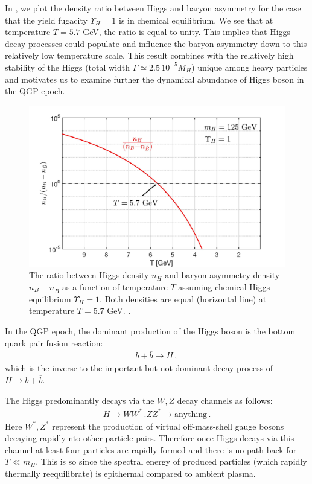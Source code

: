In , we plot the density ratio between Higgs and baryon asymmetry for the case that the yield fugacity $\Upsilon_H=1$ is in chemical equilibrium. We see that at temperature $T=5.7$ GeV, the ratio is equal to unity. This implies that Higgs decay processes could populate and influence the baryon asymmetry down to this relatively low temperature scale.  This result combines with the relatively high stability of the Higgs  (total width $\Gamma\simeq 2.5\,10^{-5}M_H$) unique among heavy particles and motivates us to examine further the dynamical abundance of Higgs boson in the QGP epoch.

\begin{figure}
\centerline{\includegraphics[width=0.9\linewidth]{./plots/HiggsDensityRatio}}
\caption{The ratio between Higgs  density  $n_H$ and baryon asymmetry  density $n_B-n_{\bar B}$ as a function of temperature $T$ assuming chemical Higgs equilibrium $\Upsilon_H=1$. Both densities are equal (horizontal line) at temperature $T=5.7$ GeV. .}
\label{HiggsDensity_fig} 
\end{figure}

In the QGP epoch, the dominant production of the Higgs boson is the bottom quark pair fusion reaction: 
\begin{align}
b+\overline{b}\longrightarrow H\,,
\end{align}
which is the inverse to the important but not dominant decay process of $H\to b+\overline{b}$.

The Higgs predominantly decays via the $W,Z$ decay channels as follows:
\begin{align}
H\longrightarrow WW^\ast\,. ZZ^\ast\longrightarrow\mathrm{anything}\,.
\end{align}
Here $W^\ast,Z^\ast$ represent the production of virtual off-mass-shell gauge bosons decaying rapidly nto  other particle pairs.  Therefore once Higgs decays via this channel at least four particles are rapidly formed and there is no path back for $T\ll m_H$. This is so since the spectral energy of produced particles (which rapidly thermally reequilibrate) is epithermal compared to ambient plasma. 

